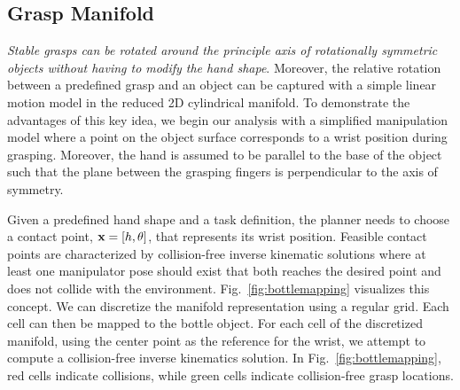 \documentclass{aamas2015}
\begin{document}
\subsection{Grasp Manifold}

\textit{Stable grasps can be rotated around the principle axis of rotationally symmetric objects
without having to modify the hand shape}. Moreover, the relative rotation between a predefined grasp
and an object can be captured with a simple linear motion model in the reduced 2D cylindrical
manifold. To demonstrate the advantages of this key idea, we begin our analysis with a simplified
manipulation model where a point on the object surface corresponds to a wrist position during
grasping. Moreover, the hand is assumed to be parallel to the base of the object such that the plane
between the grasping fingers is perpendicular to the axis of symmetry. 

Given a predefined hand shape and a task definition, the planner needs to choose a contact point,
$\textbf{x} = [h, \theta]$, that represents its wrist position. Feasible contact points are characterized
by collision-free inverse kinematic solutions where at least one manipulator pose should exist that both reaches the desired point and does not collide with the environment. Fig.~\ref{fig:bottlemapping} visualizes this concept. We can discretize the manifold representation using a regular grid. Each cell can then be mapped to the bottle object. For each cell of the
discretized manifold, using the center point  as the reference for the wrist, we attempt to compute a collision-free inverse kinematics solution. In Fig.~\ref{fig:bottlemapping}, red cells indicate collisions, while green cells indicate collision-free grasp locations. 
\end{document}
